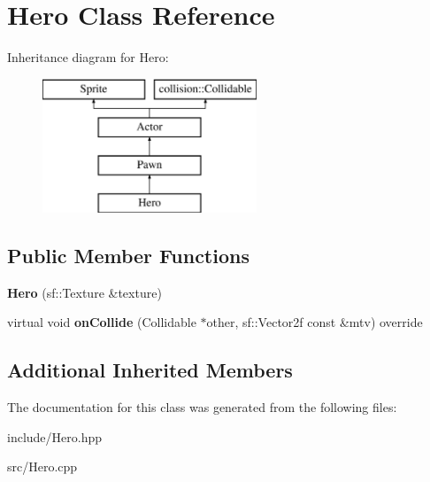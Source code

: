 \hypertarget{class_hero}{}\section{Hero Class Reference}
\label{class_hero}
Inheritance diagram for Hero\+:\begin{figure}[H]
\begin{center}
\leavevmode
\includegraphics[height=4.000000cm]{class_hero}
\end{center}
\end{figure}
\subsection*{Public Member Functions}
\begin{DoxyCompactItemize}
\item 
\hypertarget{class_hero_ad129609f1a95c795e196007069d43c40}{}{\bfseries Hero} (sf\+::\+Texture \&texture)\label{class_hero_ad129609f1a95c795e196007069d43c40}

\item 
\hypertarget{class_hero_a1f9b68a8daecbca5ca949764332c72d7}{}virtual void {\bfseries on\+Collide} (Collidable $\ast$other, sf\+::\+Vector2f const \&mtv) override\label{class_hero_a1f9b68a8daecbca5ca949764332c72d7}

\end{DoxyCompactItemize}
\subsection*{Additional Inherited Members}


The documentation for this class was generated from the following files\+:\begin{DoxyCompactItemize}
\item 
include/Hero.\+hpp\item 
src/Hero.\+cpp\end{DoxyCompactItemize}
